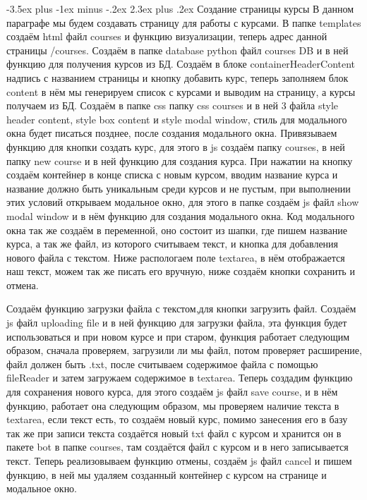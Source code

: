 \documentclass[12pt, oldlfont, amsfonts]{report}
\makeatletter
\renewcommand{\section}{\@startsection{section}{1}{0pt}%
                                {-3.5ex plus -1ex minus -.2ex}%
                                {2.3ex plus .2ex}%
{\centering\hyphenpenalty=10000\normalfont\Large\bfseries}}
\makeatother
\begin{document}
\section{Создание страницы курсы}
В данном параграфе мы будем создавать страницу для работы с курсами. В папке templates создаём html файл { courses} и функцию визуализации, теперь адрес данной страницы { /courses}. Создаём в папке database python файл { courses DB} и в ней функцию для получения курсов из БД. Создаём в блоке { containerHeaderContent} надпись с названием страницы и кнопку { добавить курс}, теперь заполняем блок { content} в нём мы генерируем список с курсами и выводим на страницу, а курсы получаем из БД. Создаём в папке css папку { css courses} и в ней 3 файла { style header content}, { style box content} и { style modal window}, стиль для модального окна будет писаться позднее, после создания модального окна. Привязываем функцию для кнопки создать курс, для этого в js создаём папку { courses}, в ней папку { new course} и в ней функцию для создания курса. При нажатии на кнопку создаём контейнер в конце списка с новым курсом, вводим название курса и название должно быть уникальным среди курсов и не пустым, при выполнении этих условий открываем модальное окно, для этого в папке создаём js файл { show modal window} и в нём функцию для создания модального окна. Код модального окна так же создаём в переменной, оно состоит из шапки, где пишем название курса, а так же файл, из которого считываем текст, и кнопка для добавления нового файла с текстом. Ниже распологаем поле textarea, в нём отображается наш текст, можем так же писать его вручную, ниже создаём кнопки сохранить и отмена. 

Создаём функцию загрузки файла с текстом,для кнопки загрузить файл. Создаём js файл { uploading file} и в ней функцию для загрузки файла, эта функция будет использоваться и при новом курсе и при старом, функция работает следующим образом, сначала проверяем, загрузили ли мы файл, потом проверяет расширение, файл должен быть { .txt}, после считываем содержимое файла с помощью { fileReader} и затем загружаем содержимое в textarea. Теперь создадим функцию для сохранения нового курса, для этого создаём js файл {save course}, и в нём функцию, работает она следующим образом, мы проверяем наличие текста в textarea, если текст есть, то создаём новый курс, помимо занесения его в базу так же при записи текста создаётся новый txt файл с курсом и хранится он в пакете { bot} в папке { courses}, там создаётся файл с курсом и в него записывается текст. Теперь реализовываем функцию отмены, создаём js файл { cancel} и пишем функцию, в ней мы удаляем созданный контейнер с курсом на странице и модальное окно.
\end{document}
